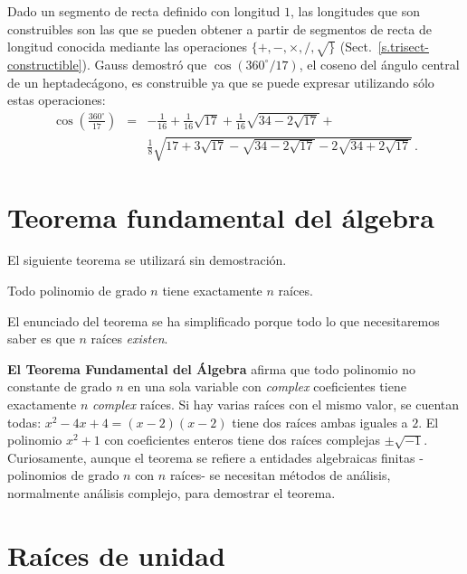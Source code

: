 Dado un segmento de recta definido con longitud $1$, las longitudes que son construibles son las que se pueden obtener a partir de segmentos de recta de longitud conocida mediante las operaciones $\{+,-,\times,/,\surd\}$ (Sect.~\ref{s.trisect-constructible}). Gauss demostró que $\cos(360^\circ/17)$, el coseno del ángulo central de un heptadecágono, es construible ya que se puede expresar utilizando sólo estas operaciones:
\begin{eqnarray*}
\cos\left(\frac{360^\circ}{17}\right) &=& 
-\frac{1}{16}+\frac{1}{16}\sqrt{17} + 
     \frac{1}{16}\sqrt{34-2\sqrt{17}}
    + \\
    &&
     \frac{1}{8}\sqrt{
     17+3\sqrt{17} - 
     \sqrt{34-2\sqrt{17}}
   -2
     \sqrt{34+2\sqrt{17}}
   }\,.
\end{eqnarray*}

\section{Teorema fundamental del álgebra}\label{s.fundamental}

El siguiente teorema se utilizará sin demostración.

\begin{theorem}\label{thm.fundamental} Todo polinomio de grado $n$ tiene exactamente $n$ raíces.
\end{theorem}

El enunciado del teorema se ha simplificado porque todo lo que necesitaremos saber es que $n$ raíces \emph{existen}.

\begin{advanced}
\textbf{El Teorema Fundamental del Álgebra} afirma que todo polinomio no constante de grado $n$ en una sola variable con \emph{complex} coeficientes tiene exactamente $n$ \emph{complex} raíces. 
Si hay varias raíces con el mismo valor, se cuentan todas: $x^2-4x+4=(x-2)(x-2)$ tiene dos raíces ambas iguales a $2$.
El polinomio $x^2+1$ con coeficientes enteros tiene dos raíces complejas $\pm\sqrt{-1}$.
Curiosamente, aunque el teorema se refiere a entidades algebraicas finitas -polinomios de grado $n$ con $n$ raíces- se necesitan métodos de análisis, normalmente análisis complejo, para demostrar el teorema.
\end{advanced}

\section{Raíces de unidad}\label{s.roots}


